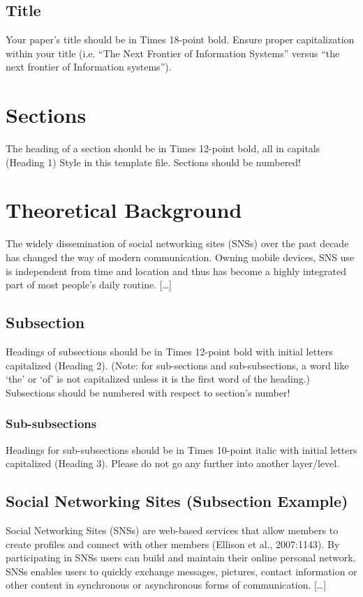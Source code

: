 \documentclass[11pt]{article}
\begin{document}
\subsection{Title}
Your paper’s title should be in Times 18-point bold. Ensure proper capitalization within your title (i.e. “The Next Frontier of Information Systems” versus “the next frontier of Information systems”).

\section{Sections}
The heading of a section should be in Times 12-point bold, all in capitals (Heading 1) Style in this template file. Sections should be numbered!

\section{Theoretical Background}
The widely dissemination of social networking sites (SNSs) over the past decade has changed the way of modern communication. Owning mobile devices, SNS use is independent from time and location and thus has become a highly integrated part of most people’s daily routine. […]

\subsection{Subsection}
Headings of subsections should be in Times 12-point bold with initial letters capitalized (Heading 2). (Note: for sub-sections and sub-subsections, a word like ‘the’ or ‘of’ is not capitalized unless it is the first word of the heading.) Subsections should be numbered with respect to section’s number!
\subsubsection{Sub-subsections}
Headings for sub-subsections should be in Times 10-point italic with initial letters capitalized (Heading 3). Please do not go any further into another layer/level.

\subsection{Social Networking Sites (Subsection Example)}
Social Networking Sites (SNSs) are web-based services that allow members to create profiles and connect with other members (Ellison et al., 2007:1143). By participating in SNSs users can build and maintain their online personal network. SNSs enables users to quickly exchange messages, pictures, contact information or other content in synchronous or asynchronous forms of communication. […]
\end{document}
